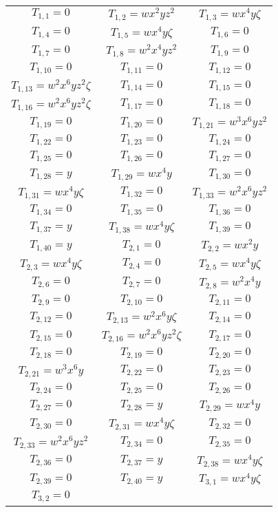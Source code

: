 \documentclass[12pt]{memoireuqam1.3}
\begin{document}
\normalsize
\tiny
\begin{longtable}{|c|c|c|} 
\hline
$T_{1,1}= 0$&
$T_{1,2}= wx^2yz^2$&
$T_{1,3}= wx^4y\zeta$\\
$T_{1,4}= 0$&
$T_{1,5}= wx^4y\zeta$&
$T_{1,6}= 0$\\
$T_{1,7}= 0$&
$T_{1,8}= w^2x^4yz^2$&
$T_{1,9}= 0$\\
$T_{1,10}= 0$&
$T_{1,11}= 0$&
$T_{1,12}= 0$\\
$T_{1,13}= w^2x^6yz^2\zeta$&
$T_{1,14}= 0$&
$T_{1,15}= 0$\\
$T_{1,16}= w^2x^6yz^2\zeta$&
$T_{1,17}= 0$&
$T_{1,18}= 0$\\
$T_{1,19}= 0$&
$T_{1,20}= 0$&
$T_{1,21}= w^3x^6yz^2$\\
$T_{1,22}= 0$&
$T_{1,23}= 0$&
$T_{1,24}= 0$\\
$T_{1,25}= 0$&
$T_{1,26}= 0$&
$T_{1,27}= 0$\\
$T_{1,28}= y$&
$T_{1,29}= wx^4y$&
$T_{1,30}= 0$\\
$T_{1,31}= wx^4y\zeta$&
$T_{1,32}= 0$&
$T_{1,33}= w^2x^6yz^2$\\
$T_{1,34}= 0$&
$T_{1,35}= 0$&
$T_{1,36}= 0$\\
$T_{1,37}= y$&
$T_{1,38}= wx^4y\zeta$&
$T_{1,39}= 0$\\
$T_{1,40}= y$&
$T_{2,1}= 0$&
$T_{2,2}= wx^2y$\\
$T_{2,3}= wx^4y\zeta$&
$T_{2,4}= 0$&
$T_{2,5}= wx^4y\zeta$\\
$T_{2,6}= 0$&
$T_{2,7}= 0$&
$T_{2,8}= w^2x^4y$\\
$T_{2,9}= 0$&
$T_{2,10}= 0$&
$T_{2,11}= 0$\\
$T_{2,12}= 0$&
$T_{2,13}= w^2x^6y\zeta$&
$T_{2,14}= 0$\\
$T_{2,15}= 0$&
$T_{2,16}= w^2x^6yz^2\zeta$&
$T_{2,17}= 0$\\
$T_{2,18}= 0$&
$T_{2,19}= 0$&
$T_{2,20}= 0$\\
$T_{2,21}= w^3x^6y$&
$T_{2,22}= 0$&
$T_{2,23}= 0$\\
$T_{2,24}= 0$&
$T_{2,25}= 0$&
$T_{2,26}= 0$\\
$T_{2,27}= 0$&
$T_{2,28}= y$&
$T_{2,29}= wx^4y$\\
$T_{2,30}= 0$&
$T_{2,31}= wx^4y\zeta$&
$T_{2,32}= 0$\\
$T_{2,33}= w^2x^6yz^2$&
$T_{2,34}= 0$&
$T_{2,35}= 0$\\
$T_{2,36}= 0$&
$T_{2,37}= y$&
$T_{2,38}= wx^4y\zeta$\\
$T_{2,39}= 0$&
$T_{2,40}= y$&
$T_{3,1}= wx^4y\zeta$\\
$T_{3,2}= 0$&

\end{longtable}
\end{document}
